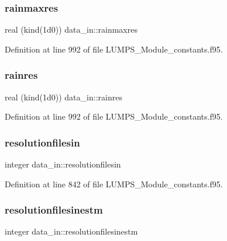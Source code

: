 \subsubsection{\texorpdfstring{rainmaxres}{rainmaxres}}
{\footnotesize\ttfamily real (kind(1d0)) data\+\_\+in\+::rainmaxres}



Definition at line 992 of file L\+U\+M\+P\+S\+\_\+\+Module\+\_\+constants.\+f95.

\mbox{\label{namespacedata__in_aaacec9be1e147ab0d69fee857ecd57cd}} 
\subsubsection{\texorpdfstring{rainres}{rainres}}
{\footnotesize\ttfamily real (kind(1d0)) data\+\_\+in\+::rainres}



Definition at line 992 of file L\+U\+M\+P\+S\+\_\+\+Module\+\_\+constants.\+f95.

\mbox{\label{namespacedata__in_a0dfb19ee9c3d77d6a086f17b231d65b8}} 
\subsubsection{\texorpdfstring{resolutionfilesin}{resolutionfilesin}}
{\footnotesize\ttfamily integer data\+\_\+in\+::resolutionfilesin}



Definition at line 842 of file L\+U\+M\+P\+S\+\_\+\+Module\+\_\+constants.\+f95.

\mbox{\label{namespacedata__in_a1babc329d678c128938354d4c21505b9}} 
\subsubsection{\texorpdfstring{resolutionfilesinestm}{resolutionfilesinestm}}
{\footnotesize\ttfamily integer data\+\_\+in\+::resolutionfilesinestm}



